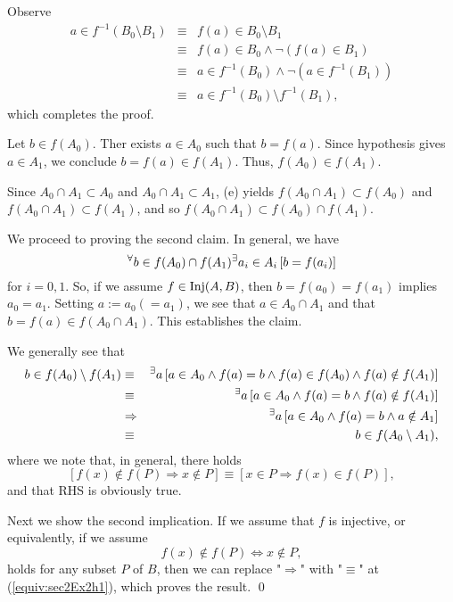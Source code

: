 \documentclass[a4paper,12pt]{article}
\begin{document}
\begin{sol}
	Observe
	\begin{eqnarray*}
		a \in f ^{-1}(B_0 \setminus B_1)
		&\equiv&
		f(a) \in B_0 \setminus B_1 \\
		&\equiv&
		f(a) \in B_0 \wedge \neg \left( f(a) \in B_1 \right)\\
		&\equiv&
		a \in  f ^{-1}(B_0) \wedge \neg \left( a \in  f ^{-1}(B_1) \right)\\
		&\equiv&
		a \in  f ^{-1}(B_0) \setminus f ^{-1}(B_1),
	\end{eqnarray*}
	which completes the proof.
	
	Let
	\( b \in f(A_0) \).
	Ther exists
	\( a \in A_0 \)
	such that
	\( b=f(a) \).
	Since hypothesis gives
	\( a \in A_1 \),
	we conclude
	\( b = f(a) \in f(A_1) \).
	Thus,
	\( f(A_0) \in f(A_1) \).
	
	Since
	\( A_0 \cap A_1 \subset A_0 \)
	and
	\( A_0 \cap A_1 \subset A_1 \),
	(e) yields
	\( f(A_0 \cap A_1) \subset f(A_0) \)
	and
	\( f(A_0 \cap A_1) \subset f(A_1) \),
	and so
	\( f(A_0 \cap A_1) \subset f(A_0) \cap f(A_1)\).
	
	We proceed to proving the second claim.
	In general, we have
	\begin{equation*}
		{}^{\forall}  b\in f(A_0)\cap f(A_1)
		{}^{\exists} a_i \in A_i
		\left[ b = f(a_i) \right]
	\end{equation*}
	for \( i=0,1 \).
	So, if we assume
	\( f \in \mathrm{Inj}(A,B) \),
	then
	\( b = f(a_0) = f(a_1) \)
	implies
	\( a_0 = a_1 \).
	Setting
	\( a:=a_0(=a_1) \),
	we see that
	\( a \in A_0 \cap A_1 \)
	and that
	\( b = f(a) \in f(A_0 \cap A_1) \).
	This establishes the claim.
	
	We generally see that
	\begin{eqnarray}
		b \in f(A_0)\setminus f(A_1)
		&\equiv&
		{}^{\exists}a
		\left[
			a\in A_0
			\wedge
			f(a)=b
			\wedge
			f(a)\in f(A_0)
			\wedge
			f(a) \notin f(A_1)
			\right]\notag\\
		&\equiv&
		{}^{\exists}a
		\left[
			a\in A_0
			\wedge
			f(a)=b
			\wedge
			f(a) \notin f(A_1)
			\right]\notag\\
		&\Rightarrow&
		{}^{\exists}a
		\left[
			a\in A_0
			\wedge
			f(a)=b
			\wedge
			a \notin A_1
			\right]\label{equiv:sec2Ex2h1}\\
		&\equiv&
		b \in f(A_0 \setminus A_1)\notag,
	\end{eqnarray}
	where we note that, in general, there holds
	\begin{equation}
		\left[ f(x)\notin f(P) \Rightarrow x \notin P  \right]
		\equiv
		\left[ x \in P \Rightarrow f(x)\in f(P) \right]\label{equiv:sectionEx2h2},
	\end{equation}
	and that RHS is obviously true.
	
	Next we show the second implication.
	If we assume that 
	\( f \)
	is injective,
	or equivalently, if we assume 
	\begin{equation*}
		f(x)\notin f(P) \Leftrightarrow x \notin P,
	\end{equation*}
	holds for any subset \( P \) of \( B \), then we can replace "\( \Rightarrow \)" with "\( \equiv \)"
	at (\ref{equiv:sec2Ex2h1}),
	which proves the result.
	\qed\end{sol}
\end{document}

